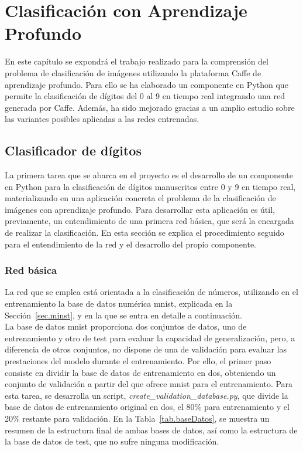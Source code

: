 \chapter{Clasificación con Aprendizaje Profundo}\label{cap.clasificacion}
En este capítulo se expondrá el trabajo realizado para la comprensión del problema de clasificación de imágenes utilizando la plataforma Caffe de aprendizaje profundo. Para ello se ha elaborado un componente en Python que permite la clasificación de dígitos del 0 al 9 en tiempo real integrando una red generada por Caffe. Además, ha sido mejorado gracias a un amplio estudio sobre las variantes posibles aplicadas a las redes entrenadas.

\section{Clasificador de dígitos}
La primera tarea que se abarca en el proyecto es el desarrollo de un componente en Python para la clasificación de dígitos manuscritos entre 0 y 9 en tiempo real, materializando en una aplicación concreta el problema de la clasificación de imágenes con aprendizaje profundo. Para desarrollar esta aplicación es útil, previamente, un entendimiento de una primera red básica, que será la encargada de realizar la clasificación. En esta sección se explica el procedimiento seguido para el entendimiento de la red y el desarrollo del propio componente.

\subsection{Red básica}\label{sec.red}
La red que se emplea está orientada a la clasificación de números, utilizando en el entrenamiento la base de datos numérica \acrshort{mnist}, explicada en la Sección~\ref{sec.minst}, y en la que se entra en detalle a continuación.\\

La base de datos \acrshort{mnist} proporciona dos conjuntos de datos, uno de entrenamiento y otro de test para evaluar la capacidad de generalización, pero, a diferencia de otros conjuntos, no dispone de una de validación para evaluar las prestaciones del modelo durante el entrenamiento. Por ello, el primer paso consiste en dividir la base de datos de entrenamiento en dos, obteniendo un conjunto de validación a partir del que ofrece \acrshort{mnist} para el entrenamiento. Para esta tarea, se desarrolla un script, \textit{create\_validation\_database.py}, que divide la base de datos de entrenamiento original en dos, el 80\% para entrenamiento y el 20\% restante para validación. En la Tabla~\ref{tab.baseDatos}, se muestra un resumen de la estructura final de ambas bases de datos, así como la estructura de la base de datos de test, que no sufre ninguna modificación.\\

